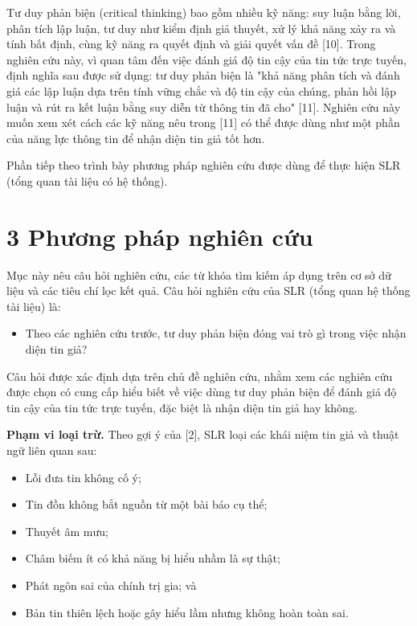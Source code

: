 Tư duy phản biện (critical thinking) bao gồm nhiều kỹ năng: suy luận bằng lời, phân tích lập luận, tư duy như kiểm định giả thuyết, xử lý khả năng xảy ra và tính bất định, cùng kỹ năng ra quyết định và giải quyết vấn đề {[}10{]}. Trong nghiên cứu này, vì quan tâm đến việc đánh giá độ tin cậy của tin tức trực tuyến, định nghĩa sau được sử dụng: tư duy phản biện là "khả năng phân tích và đánh giá các lập luận dựa trên tính vững chắc và độ tin cậy của chúng, phản hồi lập luận và rút ra kết luận bằng suy diễn từ thông tin đã cho" {[}11{]}. Nghiên cứu này muốn xem xét cách các kỹ năng nêu trong {[}11{]} có thể được dùng như một phần của năng lực thông tin để nhận diện tin giả tốt hơn.

Phần tiếp theo trình bày phương pháp nghiên cứu được dùng để thực hiện SLR (tổng quan tài liệu có hệ thống).

\section{3 Phương pháp nghiên cứu}

Mục này nêu câu hỏi nghiên cứu, các từ khóa tìm kiếm áp dụng trên cơ sở dữ liệu và các tiêu chí lọc kết quả. Câu hỏi nghiên cứu của SLR (tổng quan hệ thống tài liệu) là:

\begin{itemize}
\item
  Theo các nghiên cứu trước, tư duy phản biện đóng vai trò gì trong việc nhận diện tin giả?
\end{itemize}

Câu hỏi được xác định dựa trên chủ đề nghiên cứu, nhằm xem các nghiên cứu được chọn có cung cấp hiểu biết về việc dùng tư duy phản biện để đánh giá độ tin cậy của tin tức trực tuyến, đặc biệt là nhận diện tin giả hay không.

\textbf{Phạm vi loại trừ.} Theo gợi ý của {[}2{]}, SLR loại các khái niệm tin giả và thuật ngữ liên quan sau:

\begin{itemize}
\item
  Lỗi đưa tin không cố ý;
\item
  Tin đồn không bắt nguồn từ một bài báo cụ thể;
\item
  Thuyết âm mưu;
\item
  Châm biếm ít có khả năng bị hiểu nhầm là sự thật;
\item
  Phát ngôn sai của chính trị gia; và
\item
  Bản tin thiên lệch hoặc gây hiểu lầm nhưng không hoàn toàn sai.
\end{itemize}

